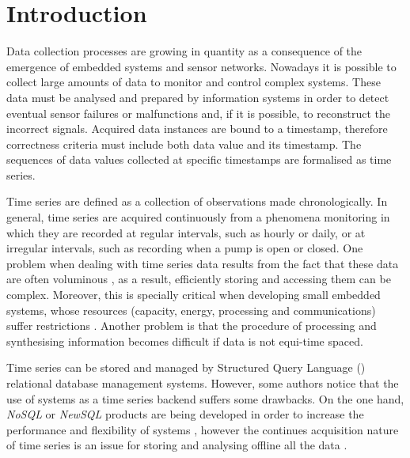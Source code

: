 


 

\section{Introduction}



Data collection processes are growing in quantity as a
consequence of the emergence of embedded systems and sensor networks.
Nowadays it is possible to collect large amounts of data to monitor
and control complex systems.  These data must be analysed and
prepared by information systems in order to detect eventual sensor
failures or malfunctions and, if it is possible, to reconstruct the
incorrect signals. Acquired data instances are bound to a timestamp,
therefore correctness criteria must include both data value and its
timestamp. The sequences of data values collected at specific
timestamps are formalised as time series.


Time series are defined as a collection of observations made
chronologically.  In general, time series are acquired continuously
from a phenomena monitoring in which they are recorded at regular
intervals, such as hourly or daily, or at irregular intervals, such as
recording when a pump is open or closed.  One problem when dealing
with time series data results from the fact that these data are often
voluminous \cite{fu11,keogh08:isax}, as a result, efficiently storing
and accessing them can be complex. Moreover, this is specially
critical when developing small embedded systems, whose resources
(capacity, energy, processing and communications) suffer restrictions
\cite{yaogehrke02}.  Another problem is that the procedure of
processing and synthesising information becomes difficult if data is
not equi-time spaced.



Time series can be stored and managed by Structured Query Language
() relational database management systems. However, some
authors \cite{dreyer94,schmidt95,stonebraker09:scidb,zhang11} notice
that the use of  systems as a time series backend suffers
some drawbacks.  On the one hand, \emph{NoSQL} or \emph{NewSQL}
products are being developed in order to increase the performance and
flexibility of  systems
\cite{atzeni13:relational_model_dead,stonebraker10,stonebraker09:scidb,zhang11},
however the continues acquisition nature of time series is an issue for
storing and analysing offline all the data \cite{keogh97}.

